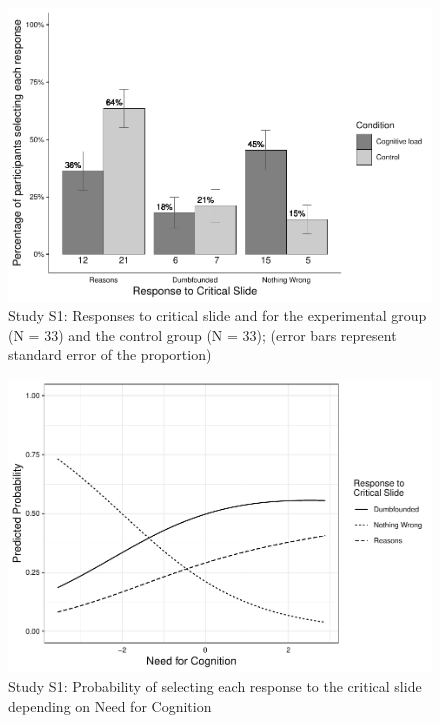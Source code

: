 \documentclass[
  man,floatsintext]{apa6}
\begin{document}
\begin{figure}[!h]
\includegraphics{Supplementary_files/figure-latex/S1S1fig2criticalcondition-1} \caption{Study S1: Responses to critical slide and for the experimental group (N = 33) and the control group (N = 33); (error bars represent standard error of the proportion)}\label{fig:S1S1fig2criticalcondition}
\end{figure}

\begin{figure}[!h]
\includegraphics{Supplementary_files/figure-latex/S1ggplotlogit1-1} \caption{Study S1: Probability of selecting each response to the critical slide depending on Need for Cognition}\label{fig:S1ggplotlogit1}
\end{figure}

\newpage

\newpage
\end{document}

